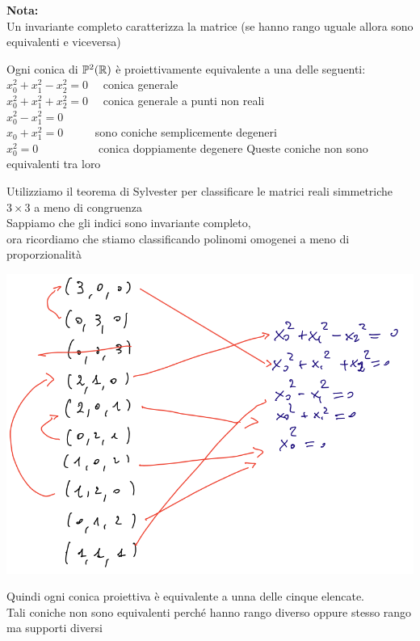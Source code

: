 \documentclass[12px]{article}
\begin{document}
	\textbf{Nota:}\\
		Un invariante completo caratterizza la matrice (se hanno rango uguale allora sono equivalenti e viceversa)\\
	\begin{teo}
			Ogni conica di $\mathbb{P}^2(\mathbb{R})$ è proiettivamente equivalente a una delle seguenti:\\
			$x_0^2+x_1^2-x_2^2 =0 $ \ \ conica generale\\
			$x_0^2+x_1^2+x_2^2 =0 $ \ \ conica generale a punti non reali\\
			$x_0^2-x_1^2=0$ \\
			$x_0+x_1^2=0$ \ \ \ \ \ sono coniche semplicemente degeneri\\
			$x_0^2 =0$ \ \ \ \ \ \ \ \ \ \ conica doppiamente degenere
Queste coniche non sono equivalenti tra loro
	\end{teo}
	\newpage
	\begin{dimo}
		Utilizziamo il teorema di Sylvester per classificare le matrici reali simmetriche $3\times 3$ a meno di congruenza\\
		Sappiamo che gli indici sono invariante completo,\\
		ora ricordiamo che stiamo classificando polinomi omogenei a meno di proporzionalità\\
		\begin{center}
			\includegraphics[scale=.4]{classificazione_coniche.png}
		\end{center}
		Quindi ogni conica proiettiva è equivalente a unna delle cinque elencate.\\
		Tali coniche non sono equivalenti perché hanno rango diverso oppure stesso rango ma supporti diversi
	\end{dimo}
\end{document}
